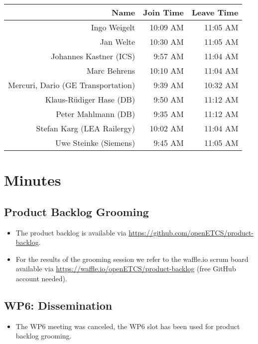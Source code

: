 \documentclass[a4paper, 11pt]{article}
\begin{document}
\begin{table}[htbp]
    \begin{tabular}{rrr}
    \toprule
    \textbf{Name} & \textbf{Join Time} & \textbf{Leave Time} \\
    \midrule
    Ingo Weigelt & 10:09 AM & 11:05 AM \\
    Jan Welte & 10:30 AM & 11:05 AM \\
    Johannes Kastner (ICS) & 9:57 AM & 11:04 AM \\
    Marc Behrens & 10:10 AM & 11:04 AM \\
    Mercuri, Dario (GE Transportation) & 9:39 AM & 10:32 AM \\
    Klaus-R\"udiger Hase (DB) & 9:50 AM & 11:12 AM \\
    Peter Mahlmann (DB) & 9:35 AM & 11:12 AM \\
    Stefan Karg (LEA Railergy) & 10:02 AM & 11:04 AM \\
    Uwe Steinke (Siemens) & 9:45 AM & 11:05 AM \\
    \bottomrule
    \end{tabular}%
  \label{tab:addlabel}%
\end{table}%




\section{Minutes}

\subsection{Product Backlog Grooming}
\begin{itemize}
\item The product backlog is available via 
\url{https://github.com/openETCS/product-backlog}. 
\item For the results of the grooming session we refer to the waffle.io scrum board available via \url{https://waffle.io/openETCS/product-backlog} (free GitHub account needed).
\end{itemize}

\subsection{WP6: Dissemination}
\begin{itemize}
\item The WP6 meeting was canceled, the WP6 slot has been used for product backlog grooming.
\end{itemize}
\end{document}
